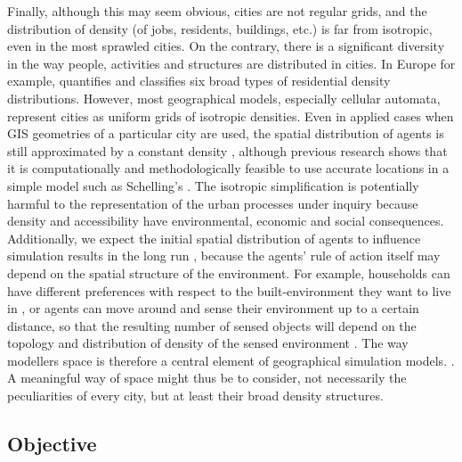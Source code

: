 \documentclass[3p,times,procedia]{elsarticle}
\begin{document}
Finally, although this may seem obvious, cities are not regular grids, and the distribution of density (of jobs, residents, buildings, etc.)  is far from isotropic, even in the most sprawled cities. On the contrary, there is a significant diversity in the way people, activities and structures are distributed in cities. In Europe for example, \citet{LeNechet2015} quantifies and classifies six broad types of residential density distributions. However, most geographical models, especially cellular automata,  represent cities as uniform grids of isotropic densities. Even in applied cases when GIS geometries of a particular city are used, the spatial distribution of agents is still approximated by a constant density \citep{arribas2014diverse}, although previous research shows that it is computationally and methodologically feasible to use accurate locations in a simple model such as Schelling's \citep{benenson2002entity}. The isotropic simplification is potentially harmful to the representation of the urban processes under inquiry because density and accessibility have environmental, economic and social consequences. Additionally, we expect the initial spatial distribution of agents to influence simulation results in the long run \citep{Castellanoetal2009}, because the agents' rule of action itself may depend on the spatial structure of the environment. For example, households can have different preferences with respect to the built-environment they want to live in \citep{SpielmanHarrison2014}, or agents can move around and sense their environment up to a certain distance, so that the resulting number of sensed objects will depend on the topology \citep{Banos2012} and distribution of density of the sensed environment \citep{LauriJaggi2003, FossettDietrich2009}. The way modellers  space is therefore a central element of geographical simulation models. . A meaningful way of  space might thus be to consider, not necessarily the peculiarities of every city, but at least their broad density structures.

\subsection{Objective}
\end{document}
